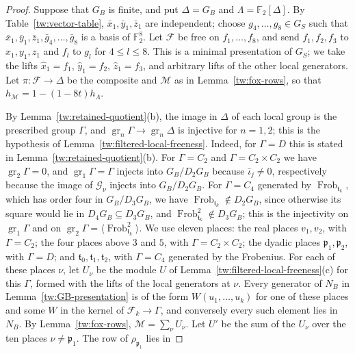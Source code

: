 \documentclass[11pt]{amsart}
\numberwithin{equation}{section}
\theoremstyle{definition}
\theoremstyle{remark}
\DeclareMathOperator{\Frob}{Frob}
\newcommand{\Ftwo}{\mathbb F_2}
\begin{document}
\begin{proof}
Suppose that $G_B$ is finite, and put $\Delta=G_B$ and
$\Lambda=\Ftwo[\Delta]$. By Table~\ref{tw:vector-table},
$\bar x_1,\bar y_1,\bar z_1$ are independent; choose
$g_4,\dots,g_8\in G_S$ such that
$\bar x_1,\bar y_1,\bar z_1,\bar g_4,\dots,\bar g_8$ is a basis of
$\Ftwo^8$. Let $\mathcal F$ be free on $f_1,\dots,f_8$, and send
$f_1,f_2,f_3$ to $x_1,y_1,z_1$ and $f_l$ to $g_l$ for $4\le l\le8$. This is a
minimal presentation of
$G_S$; we take the lifts $\hat x_1=f_1$, $\hat y_1=f_2$,
$\hat z_1=f_3$, and arbitrary lifts of the other local generators. Let
$\pi\colon\mathcal F\to\Delta$ be the composite and $\mathcal M$ as in
Lemma~\ref{tw:fox-rows}, so that $h_{\mathcal M}=1-(1-8t)h_\Lambda$.

By Lemma~\ref{tw:retained-quotient}(b), the image in $\Delta$ of each
local group is the prescribed group $\Gamma$, and
$\operatorname{gr}_n\Gamma\to\operatorname{gr}_n\Delta$ is injective for
$n=1,2$; this is the hypothesis of
Lemma~\ref{tw:filtered-local-freeness}. Indeed, for $\Gamma=D$ this is stated
in Lemma~\ref{tw:retained-quotient}(b). For $\Gamma=C_2$ and
$\Gamma=C_2\times C_2$ we have $\operatorname{gr}_2\Gamma=0$, and
$\operatorname{gr}_1\Gamma=\Gamma$ injects into $G_B/D_2G_B$ because
$\bar\iota_j\ne0$, respectively because the image of $\mathcal G_\nu$ injects
into $G_B/D_2G_B$. For $\Gamma=C_4$ generated by $\Frob_{\mathfrak t_k}$,
which has order four in $G_B/D_3G_B$, we have
$\Frob_{\mathfrak t_k}\notin D_2G_B$, since otherwise its square would lie in
$D_4G_B\subseteq D_3G_B$, and $\Frob_{\mathfrak t_k}^2\notin D_3G_B$; this is
the injectivity on $\operatorname{gr}_1\Gamma$ and on
$\operatorname{gr}_2\Gamma=\langle\Frob_{\mathfrak t_k}^2\rangle$. We use
eleven places: the real
places $v_1,v_2$, with $\Gamma=C_2$; the four places above $3$ and $5$, with
$\Gamma=C_2\times C_2$; the dyadic places $\mathfrak p_1,\mathfrak p_2$, with
$\Gamma=D$; and $\mathfrak t_0,\mathfrak t_1,\mathfrak t_2$, with $\Gamma=C_4$
generated by the Frobenius. For each of these places $\nu$, let $U_\nu$ be
the module $U$ of Lemma~\ref{tw:filtered-local-freeness}(c) for this $\Gamma$,
formed with the lifts of the local generators at $\nu$. Every generator of
$N_B$ in Lemma~\ref{tw:GB-presentation} is of the form $W(u_1,\dots,u_k)$ for
one of these places and some $W$ in the kernel of $\mathcal F_k\to\Gamma$, and
conversely every such element lies in $N_B$. By Lemma~\ref{tw:fox-rows},
$\mathcal M=\sum_\nu U_\nu$. Let $U'$ be the sum of the $U_\nu$ over the ten
places $\nu\ne\mathfrak p_1$. The row of $\rho_{\mathfrak p_1}$ lies in

\end{proof}
\end{document}
